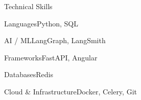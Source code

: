 \documentclass[
	11pt
]{../../../template}
\begin{document}
	\begin{rSection}{T}{echnical Skills}
		\begin{rSet}{Languages}{Python, SQL}
		\end{rSet}
		\begin{rSet}{AI / ML}{LangGraph, LangSmith}
		\end{rSet}
		\begin{rSet}{Frameworks}{FastAPI, Angular}
		\end{rSet}
		\begin{rSet}{Databases}{Redis}
		\end{rSet}
		\begin{rSet}{Cloud \& Infrastructure}{Docker, Celery, Git}
		\end{rSet}
	\end{rSection}
\end{document}
